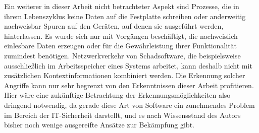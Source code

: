 Ein weiterer in dieser Arbeit nicht betrachteter Aspekt sind Prozesse, die in ihrem Lebenszyklus keine Daten auf die Festplatte schreiben oder anderweitig nachweisbar Spuren auf den Geräten, auf denen sie ausgeführt werden, hinterlassen. Es wurde sich nur mit Vorgängen beschäftigt, die nachweislich einlesbare Daten erzeugen oder für die Gewährleistung ihrer Funktionalität zumindest benötigen. Netzwerkverkehr von Schadsoftware, die beispielsweise ausschließlich im Arbeitsspeicher eines Systems arbeitet, kann deshalb nicht mit zusätzlichen Kontextinformationen kombiniert werden. Die Erkennung solcher Angriffe kann nur sehr begrenzt von den Erkenntnissen dieser Arbeit profitieren. Hier wäre eine zukünftige Betrachtung der Erkennungsmöglichkeiten also dringend notwendig, da gerade diese Art von Software ein zunehmendes Problem im Bereich der IT-Sicherheit darstellt, und es nach Wissensstand des Autors bisher noch wenige ausgereifte Ansätze zur Bekämpfung gibt.

